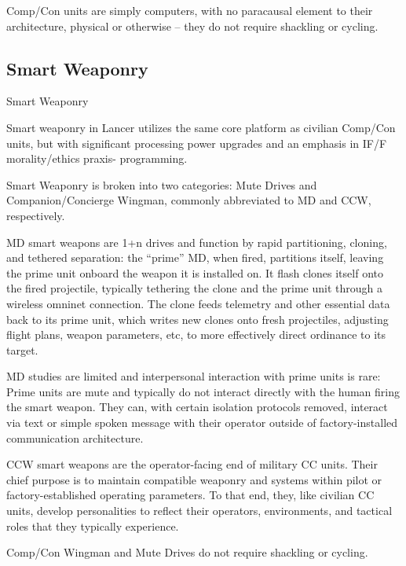 Comp/Con units are simply computers, with no paracausal element to their architecture, physical  
or otherwise -- they do not require shackling or cycling. 
 

                                                                                                         
\subsection{Smart Weaponry  }

Smart Weaponry  

Smart weaponry in Lancer utilizes the same core platform as civilian Comp/Con units, but with  
significant processing power upgrades and an emphasis in IF/F morality/ethics praxis- 
programming.  
 

Smart Weaponry is broken into two categories: Mute Drives and Companion/Concierge  
Wingman, commonly abbreviated to MD and CCW, respectively.  
 

MD smart weapons are 1+n drives and function by rapid partitioning, cloning, and tethered  
separation: the “prime” MD, when fired, partitions itself, leaving the prime unit onboard the  
weapon it is installed on. It flash clones itself onto the fired projectile, typically tethering the clone  
and the prime unit through a wireless omninet connection. The clone feeds telemetry and other  
essential data back to its prime unit, which writes new clones onto fresh projectiles, adjusting  
flight plans, weapon parameters, etc, to more effectively direct ordinance to its target.   
 

MD studies are limited and interpersonal interaction with prime units is rare: Prime units are mute  
and typically do not interact directly with the human firing the smart weapon. They can, with  
certain isolation protocols removed, interact via text or simple spoken message with their  
operator outside of factory-installed communication architecture.  
 

CCW smart weapons are the operator-facing end of military CC units. Their chief purpose is to  
maintain compatible weaponry and systems within pilot or factory-established operating  
parameters. To that end, they, like civilian CC units, develop personalities to reflect their  
operators, environments, and tactical roles that they typically experience. 
 

Comp/Con Wingman and Mute Drives do not require shackling or cycling.  


